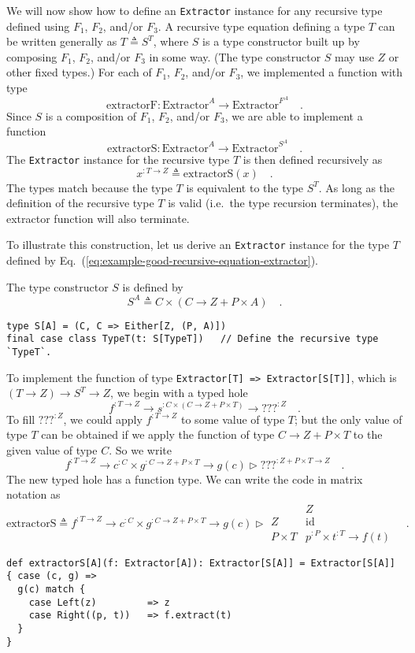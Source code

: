 We will now show how to define an \lstinline!Extractor! instance
for any recursive type defined using $F_{1}$, $F_{2}$, and/or $F_{3}$.
A recursive type equation defining a type $T$ can be written generally
as $T\triangleq S^{T}$, where $S$ is a type constructor built up
by composing $F_{1}$, $F_{2}$, and/or $F_{3}$ in some way. (The
type constructor $S$ may use $Z$ or other fixed types.) For each
of $F_{1}$, $F_{2}$, and/or $F_{3}$, we implemented a function
with type 
\[
\text{extractorF}:\text{Extractor}^{A}\rightarrow\text{Extractor}^{F^{A}}\quad.
\]
Since $S$ is a composition of $F_{1}$, $F_{2}$, and/or $F_{3}$,
we are able to implement a function 
\[
\text{extractorS}:\text{Extractor}^{A}\rightarrow\text{Extractor}^{S^{A}}\quad.
\]
The \lstinline!Extractor! instance for the recursive type $T$ is
then defined recursively as
\[
x^{:T\rightarrow Z}\triangleq\text{extractorS}\left(x\right)\quad.
\]
The types match because the type $T$ is equivalent to the type $S^{T}$.
As long as the definition of the recursive type $T$ is valid (i.e.~the
type recursion terminates), the extractor function will also terminate.

To illustrate this construction, let us derive an \lstinline!Extractor!
instance for the type $T$ defined by Eq.~(\ref{eq:example-good-recursive-equation-extractor}).

The type constructor $S$ is defined by
\[
S^{A}\triangleq C\times\left(C\rightarrow Z+P\times A\right)\quad.
\]
\begin{lstlisting}
type S[A] = (C, C => Either[Z, (P, A)])
final case class TypeT(t: S[TypeT])   // Define the recursive type `TypeT`. 
\end{lstlisting}
To implement the function of type \lstinline!Extractor[T] => Extractor[S[T]]!,
which is $\left(T\rightarrow Z\right)\rightarrow S^{T}\rightarrow Z$,
we begin with a typed hole
\[
f^{:T\rightarrow Z}\rightarrow s^{:C\times\left(C\rightarrow Z+P\times T\right)}\rightarrow\text{???}^{:Z}\quad.
\]
To fill $\text{???}^{:Z}$, we could apply $f^{:T\rightarrow Z}$
to some value of type $T$; but the only value of type $T$ can be
obtained if we apply the function of type $C\rightarrow Z+P\times T$
to the given value of type $C$. So we write
\[
f^{:T\rightarrow Z}\rightarrow c^{:C}\times g^{:C\rightarrow Z+P\times T}\rightarrow g(c)\triangleright\text{???}^{:Z+P\times T\rightarrow Z}\quad.
\]
The new typed hole has a function type. We can write the code in matrix
notation as
\[
\text{extractorS}\triangleq f^{:T\rightarrow Z}\rightarrow c^{:C}\times g^{:C\rightarrow Z+P\times T}\rightarrow g(c)\triangleright\begin{array}{|c||c|}
 & Z\\
\hline Z & \text{id}\\
P\times T & p^{:P}\times t^{:T}\rightarrow f(t)
\end{array}\quad.
\]
\begin{lstlisting}
def extractorS[A](f: Extractor[A]): Extractor[S[A]] = Extractor[S[A]] { case (c, g) =>
  g(c) match {
    case Left(z)         => z
    case Right((p, t))   => f.extract(t)
  }
}
\end{lstlisting}

